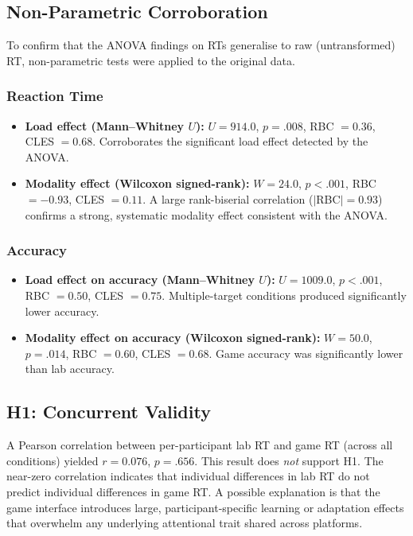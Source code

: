 \documentclass[12pt]{article}
\begin{document}
\subsection{Non-Parametric Corroboration}

To confirm that the ANOVA findings on RTs generalise to raw (untransformed)
RT, non-parametric tests were applied to the original data.

\subsubsection{Reaction Time}

\begin{itemize}
  \item \textbf{Load effect (Mann--Whitney $U$):}
    $U = 914.0$, $p = .008$, RBC $= 0.36$, CLES $= 0.68$.
    Corroborates the significant load effect detected by the ANOVA.
  \item \textbf{Modality effect (Wilcoxon signed-rank):}
    $W = 24.0$, $p < .001$, RBC $= -0.93$, CLES $= 0.11$.
    A large rank-biserial correlation ($|$RBC$| = 0.93$) confirms a
    strong, systematic modality effect consistent with the ANOVA.
\end{itemize}

\subsubsection{Accuracy}

\begin{itemize}
  \item \textbf{Load effect on accuracy (Mann--Whitney $U$):}
    $U = 1009.0$, $p < .001$, RBC $= 0.50$, CLES $= 0.75$.
    Multiple-target conditions produced significantly lower accuracy.
  \item \textbf{Modality effect on accuracy (Wilcoxon signed-rank):}
    $W = 50.0$, $p = .014$, RBC $= 0.60$, CLES $= 0.68$.
    Game accuracy was significantly lower than lab accuracy.
\end{itemize}

\subsection{H1: Concurrent Validity}

A Pearson correlation between per-participant lab RT and game RT (across all
conditions) yielded $r = 0.076$, $p = .656$.
This result does \emph{not} support H1.
The near-zero correlation indicates that individual differences in lab RT
do not predict individual differences in game RT.
A possible explanation is that the game interface introduces large,
participant-specific learning or adaptation effects that overwhelm any
underlying attentional trait shared across platforms.
\end{document}
